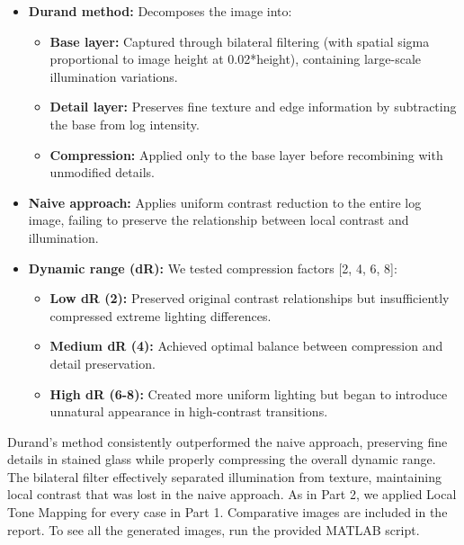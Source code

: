 \documentclass[a4paper,10pt]{article}
\begin{document}
\begin{itemize}
    \item \textbf{Durand method:} Decomposes the image into:
    \begin{itemize}
        \item \textbf{Base layer:} Captured through bilateral filtering (with spatial sigma proportional to image height at 0.02*height), containing large-scale illumination variations.
        \item \textbf{Detail layer:} Preserves fine texture and edge information by subtracting the base from log intensity.
        \item \textbf{Compression:} Applied only to the base layer before recombining with unmodified details.
    \end{itemize}
    
    \item \textbf{Naive approach:} Applies uniform contrast reduction to the entire log image, failing to preserve the relationship between local contrast and illumination.
    
    \item \textbf{Dynamic range (dR):} We tested compression factors [2, 4, 6, 8]:
    \begin{itemize}
        \item \textbf{Low dR (2):} Preserved original contrast relationships but insufficiently compressed extreme lighting differences.
        \item \textbf{Medium dR (4):} Achieved optimal balance between compression and detail preservation.
        \item \textbf{High dR (6-8):} Created more uniform lighting but began to introduce unnatural appearance in high-contrast transitions.
    \end{itemize}
\end{itemize}

Durand's method consistently outperformed the naive approach, preserving fine details in stained glass while properly compressing the overall dynamic range. The bilateral filter effectively separated illumination from texture, maintaining local contrast that was lost in the naive approach.
As in Part 2, we applied Local Tone Mapping for every case in Part 1. Comparative images are included in the report. To see all the generated images, run the provided MATLAB script.
\end{document}
